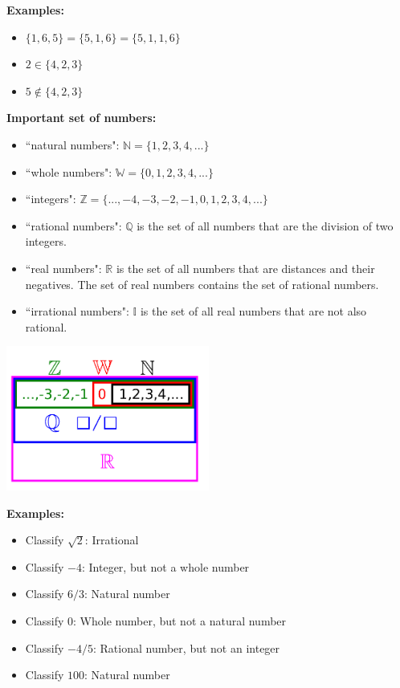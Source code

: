 \documentclass{article}
\begin{document}
\textbf{Examples:}
\begin{itemize}
\item \(\{1, 6, 5\} = \{5, 1, 6\} = \{5, 1, 1, 6\}\)
\item \(2 \in \{4, 2, 3\}\)
\item \(5 \notin \{4, 2, 3\}\)
\end{itemize}

\textbf{Important set of numbers:}
\begin{itemize}
\item ``natural numbers": \(\mathbb{N} = \{1, 2, 3, 4, ...\}\)
\item ``whole numbers": \(\mathbb{W} = \{0, 1, 2, 3, 4, ...\}\)
\item ``integers": \(\mathbb{Z} = \{..., -4, -3, -2, -1, 0, 1, 2, 3, 4, ...\}\)
\item ``rational numbers": \(\mathbb{Q}\) is the set of all numbers that are the division of two integers. 
\item ``real numbers": \(\mathbb{R}\) is the set of all numbers that are distances and their negatives. The set of real numbers contains the set of rational numbers.
\item ``irrational numbers": \(\mathbb{I}\) is the set of all real numbers that are not also rational. %
\end{itemize}

\includegraphics[width = 0.5\textwidth]{set_of_real_numbers}

\textbf{Examples:}

\begin{itemize}
\item Classify \(\sqrt{2}\): Irrational
\item Classify \(-4\): Integer, but not a whole number
\item Classify \(6/3\): Natural number
\item Classify \(0\): Whole number, but not a natural number
\item Classify \(-4/5\): Rational number, but not an integer
\item Classify \(100\): Natural number
\end{itemize}
\end{document}
